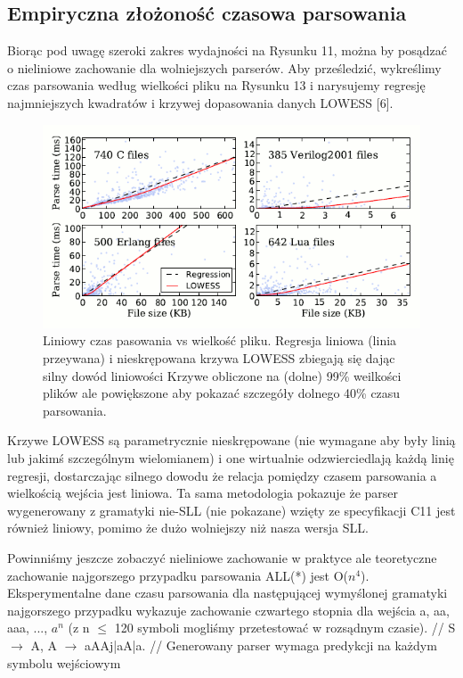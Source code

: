 \subsection{Empiryczna złożoność czasowa parsowania}
Biorąc pod uwagę szeroki zakres wydajności na Rysunku 11, można by posądzać o nieliniowe
zachowanie dla wolniejszych parserów. Aby prześledzić, wykreślimy czas parsowania według
wielkości pliku na Rysunku 13 i narysujemy regresję najmniejszych kwadratów
i krzywej dopasowania danych LOWESS [6].
\begin{figure}[h]
\includegraphics[scale=0.67]{Figure13.png}
\caption{
Liniowy czas pasowania vs wielkość pliku. Regresja liniowa (linia przeywana)
i nieskrępowana krzywa LOWESS zbiegają się dając silny dowód liniowości
Krzywe obliczone na (dolne) 99\% weilkości plików ale powiększone
aby pokazać szczegóły dolnego 40\% czasu parsowania.
}
\end{figure}
Krzywe LOWESS są parametrycznie nieskrępowane (nie wymagane aby były linią lub
jakimś szczególnym wielomianem) i one wirtualnie odzwierciedlają każdą
linię regresji, dostarczając silnego dowodu że relacja
pomiędzy czasem parsowania a wielkością wejścia jest liniowa.
Ta sama metodologia pokazuje że parser wygenerowany z gramatyki nie-SLL (nie pokazane)
wzięty ze specyfikacji C11 jest również liniowy, pomimo że dużo wolniejszy niż nasza wersja SLL.
\par
Powinniśmy jeszcze zobaczyć nieliniowe zachowanie w praktyce ale teoretyczne
zachowanie najgorszego przypadku parsowania ALL(*) jest O($n^4$). Eksperymentalne
dane czasu parsowania dla następującej wymyślonej gramatyki najgorszego przypadku
wykazuje zachowanie czwartego stopnia dla wejścia a, aa, aaa,
..., $a^n$ (z n $\leqslant$ 120 symboli mogliśmy przetestować w rozsądnym czasie).
//
S $\rightarrow$ A, A $\rightarrow$ aAAj|aA|a.
//
Generowany parser wymaga predykcji na każdym symbolu wejściowym
